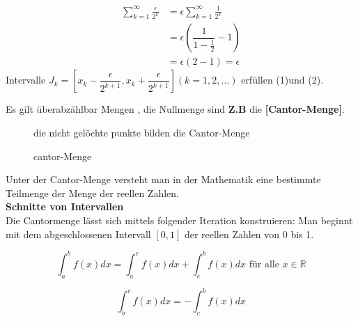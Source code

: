 \begin{align*}
\sum_{k=1}^{\infty}{\frac{\epsilon}{2^k}} &= \epsilon \sum_{k=1}^{\infty}{\frac{1}{2^k}}\\
&= \epsilon (\dfrac{1}{1-\frac{1}{2}}-1)\\
&= \epsilon(2-1)= \epsilon
\end{align*}
Intervalle $J_k = [x_k - \dfrac{\epsilon}{2^{k+1}}, x_k + \dfrac{\epsilon}{2^{k+1}}](k=1,2,\dots)$ erfüllen (1)und (2).
\begin{remark}
Es gilt überabzählbar Mengen , die Nullmenge sind \textbf{Z.B} die \textbf{[Cantor-Menge]}.

\begin{figure}
	
\centering
{}
	\caption{cantor-Menge}
	die nicht gelöchte punkte bilden die Cantor-Menge
\end{figure}


\end{remark}
\begin{definition}
Unter der Cantor-Menge versteht man in der Mathematik eine bestimmte Teilmenge der Menge der reellen Zahlen.\\
\textbf{Schnitte von Intervallen}\\
Die Cantormenge lässt sich mittels folgender Iteration konstruieren:
Man beginnt mit dem abgeschlossenen Intervall $[0,1]$ der reellen Zahlen von 0 bis 1. 
\end{definition}
\[ \int_{a}^{b} f(x) dx = \int_{a}^{c} f(x) dx + \int_{c}^{b} f(x) dx \text{ für alle } x \in \mathbb{R} \]
\begin{definition}
$$ \int_{b}^{c} f(x) dx = - \int_{c}^{b} f(x) dx $$ 
\end{definition}
